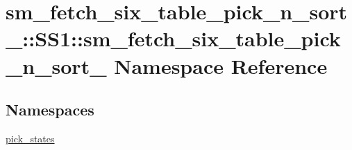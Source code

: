 \hypertarget{namespacesm__fetch__six__table__pick__n__sort__1_1_1SS1_1_1sm__fetch__six__table__pick__n__sort__1}{}\section{sm\+\_\+fetch\+\_\+six\+\_\+table\+\_\+pick\+\_\+n\+\_\+sort\+\_\+:\+:S\+S1\+:\+:sm\+\_\+fetch\+\_\+six\+\_\+table\+\_\+pick\+\_\+n\+\_\+sort\+\_ Namespace Reference}
\label{namespacesm__fetch__six__table__pick__n__sort__1_1_1SS1_1_1sm__fetch__six__table__pick__n__sort__1}
\subsection*{Namespaces}
\begin{DoxyCompactItemize}
\item 
 \hyperlink{namespacesm__fetch__six__table__pick__n__sort__1_1_1SS1_1_1sm__fetch__six__table__pick__n__sort__1_1_1pick__states}{pick\+\_\+states}
\end{DoxyCompactItemize}
